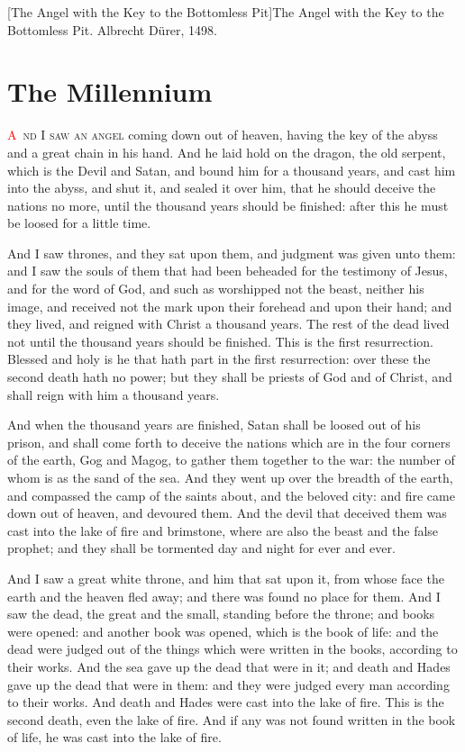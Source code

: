 [The Angel with the Key to the Bottomless Pit]{The Angel with the Key to the Bottomless Pit. Albrecht Dürer, 1498.}

\chapter{The Millennium}
\lettrine[lines=3,slope=-0.5em]{\textcolor{red}{A}}{\ nd I saw an angel} coming down out of heaven, having the key of the abyss and a great chain in his hand. 
 And he laid hold on the dragon, the old serpent, which is the Devil and Satan, and bound him for a thousand years, 
 and cast him into the abyss, and shut it, and sealed it over him, that he should deceive the nations no more, until the thousand years should be finished: after this he must be loosed for a little time.

 And I saw thrones, and they sat upon them, and judgment was given unto them: and I saw the souls of them that had been beheaded for the testimony of Jesus, and for the word of God, and such as worshipped not the beast, neither his image, and received not the mark upon their forehead and upon their hand; and they lived, and reigned with Christ a thousand years. 
 The rest of the dead lived not until the thousand years should be finished. This is the first resurrection. 
 Blessed and holy is he that hath part in the first resurrection: over these the second death hath no power; but they shall be priests of God and of Christ, and shall reign with him a thousand years.

 And when the thousand years are finished, Satan shall be loosed out of his prison, 
 and shall come forth to deceive the nations which are in the four corners of the earth, Gog and Magog, to gather them together to the war: the number of whom is as the sand of the sea. 
 And they went up over the breadth of the earth, and compassed the camp of the saints about, and the beloved city: and fire came down out of heaven, and devoured them. 
 And the devil that deceived them was cast into the lake of fire and brimstone, where are also the beast and the false prophet; and they shall be tormented day and night for ever and ever.

 And I saw a great white throne, and him that sat upon it, from whose face the earth and the heaven fled away; and there was found no place for them. 
 And I saw the dead, the great and the small, standing before the throne; and books were opened: and another book was opened, which is the book of life: and the dead were judged out of the things which were written in the books, according to their works. 
 And the sea gave up the dead that were in it; and death and Hades gave up the dead that were in them: and they were judged every man according to their works. 
 And death and Hades were cast into the lake of fire. This is the second death, even the lake of fire. 
 And if any was not found written in the book of life, he was cast into the lake of fire.